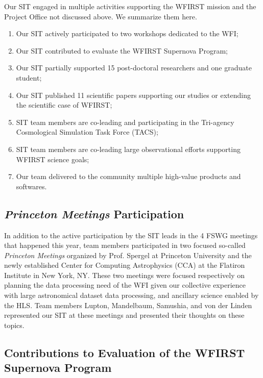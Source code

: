 

\begin{summary}
Our SIT engaged in multiple activities supporting the WFIRST mission and the Project Office not discussed above. We summarize them here.
\begin{enumerate}
\item Our SIT actively participated to two workshops dedicated to the WFI;
\item Our SIT contributed to evaluate the WFIRST Supernova Program;
\item Our SIT partially supported 15 post-doctoral researchers and one graduate student;
\item Our SIT published 11 scientific papers supporting our studies or extending the scientific case of WFIRST;
\item SIT team members are co-leading and participating in the Tri-agency Cosmological Simulation Task Force (TACS);
\item SIT team members are co-leading large observational efforts supporting WFIRST science goals;
\item Our team delivered to the community multiple high-value products and softwares.
\end{enumerate}
\end{summary}


\subsection{\emph{Princeton Meetings} Participation}

In addition to the active participation by the SIT leads in the 4 FSWG meetings that happened this year, team members participated in two focused so-called \emph{Princeton Meetings} organized by Prof. Spergel at Princeton University and  the newly established Center for Computing Astrophysics (CCA) at the Flatiron Institute in  New York, NY. These two meetings were focused respectively on planning the data processing need of the WFI given our collective experience with large astronomical dataset data processing, and ancillary science enabled by the HLS. Team members Lupton, Mandelbaum, Samushia, and von der Linden represented our SIT at these meetings and presented their thoughts on these topics.

\subsection{Contributions to Evaluation of the WFIRST Supernova Program}

